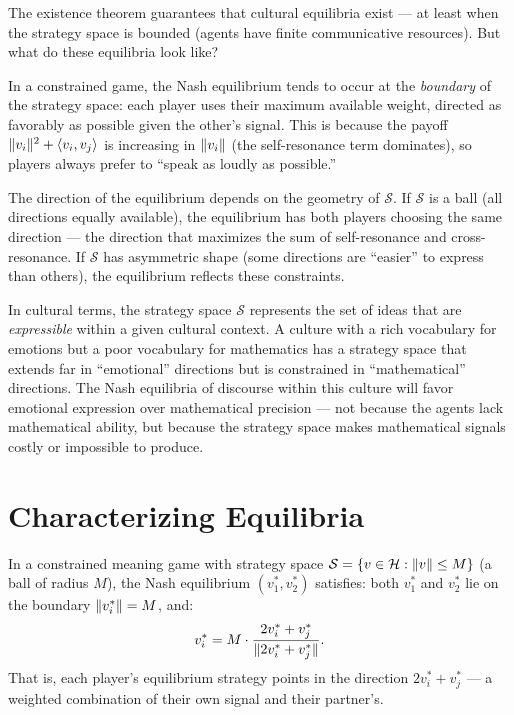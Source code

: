 \begin{interpretation}
\label{interp:fixed-points}
The existence theorem guarantees that cultural equilibria exist --- at least when
the strategy space is bounded (agents have finite communicative resources). But
what do these equilibria look like?

In a constrained game, the Nash equilibrium tends to occur at the \emph{boundary}
of the strategy space: each player uses their maximum available weight, directed
as favorably as possible given the other's signal. This is because the payoff
$\lVert v_i \rVert^2 + \langle v_i, v_j \rangle$ is increasing in $\lVert v_i \rVert$ (the self-resonance
term dominates), so players always prefer to ``speak as loudly as possible.''

The direction of the equilibrium depends on the geometry of $\mathcal{S}$. If
$\mathcal{S}$ is a ball (all directions equally available), the equilibrium has
both players choosing the same direction --- the direction that maximizes the sum
of self-resonance and cross-resonance. If $\mathcal{S}$ has asymmetric shape
(some directions are ``easier'' to express than others), the equilibrium reflects
these constraints.

In cultural terms, the strategy space $\mathcal{S}$ represents the set of ideas
that are \emph{expressible} within a given cultural context. A culture with a
rich vocabulary for emotions but a poor vocabulary for mathematics has a strategy
space that extends far in ``emotional'' directions but is constrained in
``mathematical'' directions. The Nash equilibria of discourse within this culture
will favor emotional expression over mathematical precision --- not because the
agents lack mathematical ability, but because the strategy space makes
mathematical signals costly or impossible to produce.
\end{interpretation}


\section{Characterizing Equilibria}

\begin{theorem}
\label{thm:first-order}
In a constrained meaning game with strategy space $\mathcal{S} = \{v \in
\mathcal{H} : \lVert v \rVert \leq M\}$ (a ball of radius $M$), the Nash equilibrium
$(v_1^*, v_2^*)$ satisfies: both $v_1^*$ and $v_2^*$ lie on the boundary
$\lVert v_i^* \rVert = M$, and:
\[
  v_i^* = M \cdot \frac{2v_i^* + v_j^*}{\lVert 2v_i^* + v_j^* \rVert}.
\]
That is, each player's equilibrium strategy points in the direction $2v_i^* +
v_j^*$ --- a weighted combination of their own signal and their partner's.
\end{theorem}


